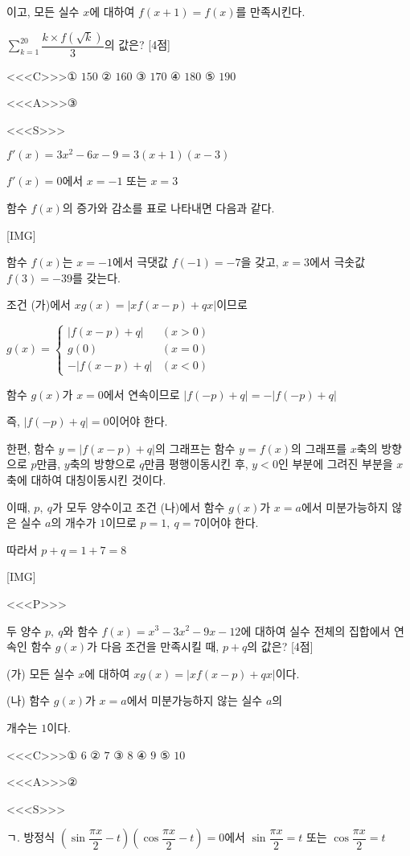 \documentclass{oblivoir}
\begin{document}
이고, 모든 실수 $x$에 대하여 $f(x+1)=f(x)$를 만족시킨다.

$\displaystyle\sum_{k=1}^{20}\dfrac{k\times f(\sqrt{k})}{3}$의 값은? [4점]

<<<C>>>① $150$ ② $160$ ③ $170$ ④ $180$ ⑤ $190$

<<<A>>>③

<<<S>>>

$f'(x)$$=3x^{2}-6x-9$$=3(x+1)(x-3)$

$f'(x)=0$에서 $x=-1$ 또는 $x=3$

함수 $f(x)$의 증가와 감소를 표로 나타내면 다음과 같다.

[IMG]

함수 $f(x)$는 $x=-1$에서 극댓값 $f(-1)=-7$을 갖고, $x=3$에서 극솟값 $f(3)=-39$를 갖는다.

조건 (가)에서 $xg(x)= | xf(x-p)+qx |$이므로

$g(x)=\begin{cases}
| f(x-p)+q |&(x>0)\\
g(0)&(x=0)\\
- | f(x-p)+q |&(x< 0)
\end{cases}$

함수 $g(x)$가 $x=0$에서 연속이므로 $| f(-p)+q | =- | f(-p)+q |$

즉, $| f(-p)+q | =0$이어야 한다.

한편, 함수 $y= | f(x-p)+q |$의 그래프는 함수 $y=f(x)$의 그래프를 $x$축의 방향으로 $p$만큼, $y$축의 방향으로 $q$만큼 평행이동시킨 후, $y< 0$인 부분에 그려진 부분을 $x$축에 대하여 대칭이동시킨 것이다.

이때, $p,\:q$가 모두 양수이고 조건 (나)에서 함수 $g(x)$가 $x=a$에서 미분가능하지 않은 실수 $a$의 개수가 $1$이므로 $p=1,\:q=7$이어야 한다.

따라서 $p+q=1+7=8$

[IMG]

<<<P>>>

두 양수 $p,\: q$와 함수 $f(x)=x^{3}-3x^{2}-9x-12$에 대하여 실수 전체의 집합에서 연속인 함수 $g(x)$가 다음 조건을 만족시킬 때, $p+q$의 값은? [4점]

(가) 모든 실수 $x$에 대하여 $xg(x)= | xf(x-p)+qx |$이다.

(나) 함수 $g(x)$가 $x=a$에서 미분가능하지 않는 실수 $a$의 

개수는 $1$이다.

<<<C>>>① $6$ ② $7$ ③ $8$ ④ $9$ ⑤ $10$

<<<A>>>②

<<<S>>>

ㄱ. 방정식 $\left(\sin\dfrac{\pi x}{2}-t\right)\left(\cos\dfrac{\pi x}{2}-t\right)=0$에서
$\sin\dfrac{\pi x}{2}=t$ 또는 $\cos\dfrac{\pi x}{2}=t$
\end{document}
